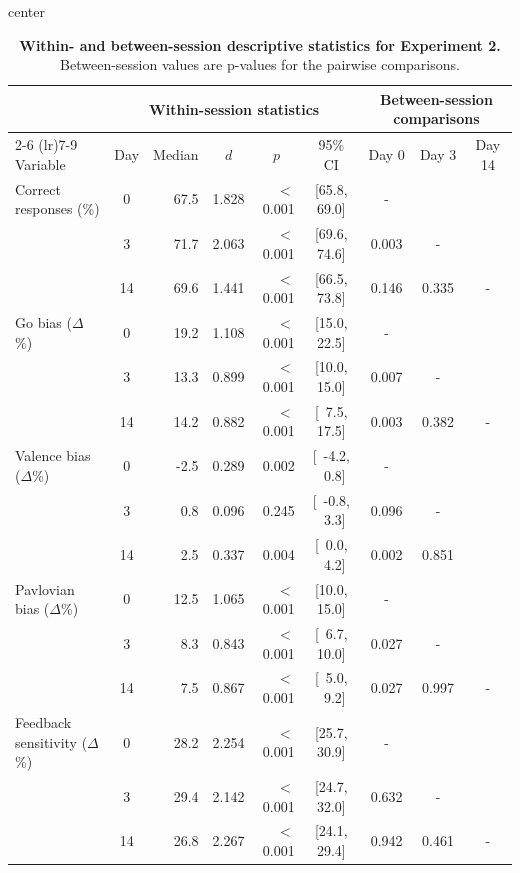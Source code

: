 \documentclass[a4paper,12pt]{article}
\begin{document}
\begin{refsection}[supp]
\begin{table}[h!]
    \centering
    \small
    \begin{adjustbox}{center}
    \begin{tabular}{lcrrrcccc}
        \toprule
                 & \multicolumn{5}{c}{Within-session statistics} & \multicolumn{3}{c}{Between-session comparisons} \\
        \cmidrule(lr){2-6} \cmidrule(lr){7-9}
        Variable & Day & Median & \multicolumn{1}{c}{$d$} & \multicolumn{1}{c}{$p$} & 95\% CI & Day 0 & Day 3 & Day 14 \\
        \midrule
         Correct responses (\%)     &  0 & 67.5 &  1.828 & $<$0.001 & [65.8, 69.0] & -     &       &   \\
                                    &  3 & 71.7 &  2.063 & $<$0.001 & [69.6, 74.6] & 0.003 & -     &   \\
                                    & 14 & 69.6 &  1.441 & $<$0.001 & [66.5, 73.8] & 0.146 & 0.335 & - \\
        \midrule
        Go bias ($\Delta$\%)        &  0 & 19.2 &  1.108 & $<$0.001 & [15.0, 22.5] & -     &       &   \\
                                    &  3 & 13.3 &  0.899 & $<$0.001 & [10.0, 15.0]  & 0.007 & -     &  \\
                                    & 14 & 14.2 &  0.882 & $<$0.001 & [\ 7.5, 17.5] & 0.003 & 0.382 & -\\
        \midrule
        Valence bias ($\Delta$\%)   &  0 &  -2.5 &  0.289 &    0.002 & [\ -4.2, \ 0.8] &        - &       &   \\
                                    &  3 &  0.8 &  0.096 &    0.245 & [\ -0.8, \ 3.3]  & 0.096 & -     & \\
                                    & 14 &  2.5 &  0.337 &    0.004 & [\ 0.0, \ 4.2] & 0.002 & 0.851     & \\
        \midrule
        Pavlovian bias ($\Delta$\%) &  0 & 12.5 & 1.065 & $<$0.001 & [10.0, 15.0] &        - &       &   \\
                                    &  3 &  8.3 & 0.843 & $<$0.001 & [\ 6.7, 10.0] & 0.027 & -     & \\
                                    & 14 &  7.5 & 0.867 & $<$0.001 & [\ 5.0, \ 9.2] & 0.027 & 0.997 & -    \\
        \midrule
        \footnotesize Feedback sensitivity ($\Delta$\%) &  0 & 28.2 & 2.254 & $<$0.001 & [25.7, 30.9] &        - &       &  \\
                                    &  3 & 29.4 & 2.142 & $<$0.001 & [24.7, 32.0] & 0.632 & -     &      \\
                                    & 14 & 26.8 & 2.267 & $<$0.001 & [24.1, 29.4] & 0.942 & 0.461 & -    \\
        \bottomrule
    \end{tabular}
    \end{adjustbox}
    \caption{{\bf Within- and between-session descriptive statistics for Experiment 2.} Between-session values are p-values for the pairwise comparisons.}
    \label{tab:stats_exp02}
\end{table}


\end{refsection}
\end{document}
